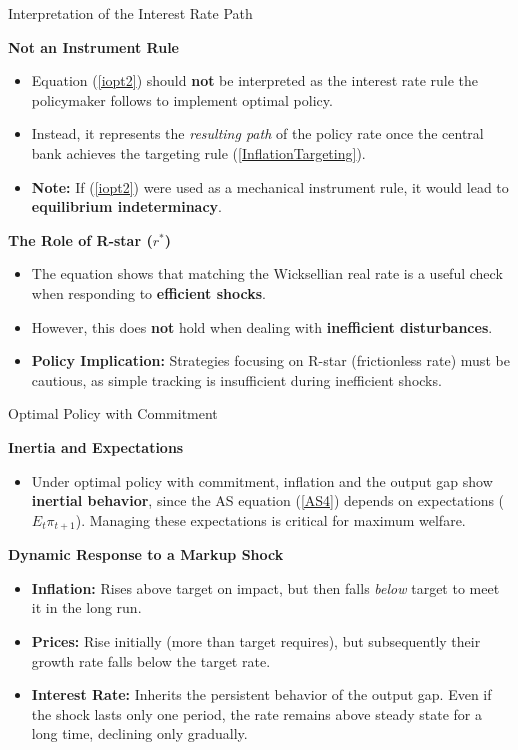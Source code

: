 \documentclass[11pt,aspectratio=169]{beamer}
\begin{document}
\begin{frame}{Interpretation of the Interest Rate Path}
\small

\textbf{Not an Instrument Rule}
\begin{itemize}
    \item Equation (\ref{iopt2}) should \textbf{not} be interpreted as the interest rate rule the policymaker follows to implement optimal policy.
    \item Instead, it represents the \textit{resulting path} of the policy rate once the central bank achieves the targeting rule (\ref{InflationTargeting}).
    \item \textbf{Note:} If (\ref{iopt2}) were used as a mechanical instrument rule, it would lead to \textbf{equilibrium indeterminacy}.
\end{itemize}

\textbf{The Role of R-star ($r^*$)}
\begin{itemize}
    \item The equation shows that matching the Wicksellian real rate is a useful check when responding to \textbf{efficient shocks}.
    \item However, this does \textbf{not} hold when dealing with \textbf{inefficient disturbances}.
    \item \textbf{Policy Implication:} Strategies focusing on R-star (frictionless rate) must be cautious, as simple tracking is insufficient during inefficient shocks.
\end{itemize}

\end{frame}

\begin{frame}{Optimal Policy with Commitment}
\small

\textbf{Inertia and Expectations}
\begin{itemize}
    \item Under optimal policy with commitment, inflation and the output gap show \textbf{inertial behavior}, since the AS equation (\ref{AS4}) depends on expectations ($E_t \pi_{t+1}$). Managing these expectations is critical for maximum welfare.
\end{itemize}

\textbf{Dynamic Response to a Markup Shock}
\begin{itemize}
    \item \textbf{Inflation:} Rises above target on impact, but then falls \textit{below} target to meet it in the long run.
    \item \textbf{Prices:} Rise initially (more than target requires), but subsequently their growth rate falls below the target rate.
    \item \textbf{Interest Rate:} Inherits the persistent behavior of the output gap. Even if the shock lasts only one period, the rate remains above steady state for a long time, declining only gradually.
\end{itemize}
\end{frame}
\end{document}
